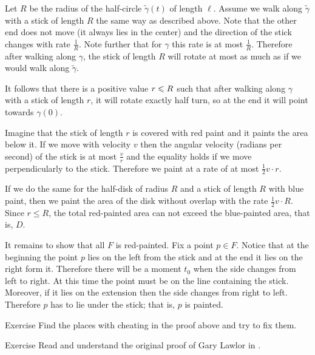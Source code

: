 Let $R$ be the radius of the half-circle $\tilde\gamma(t)$ of length $\ell$.
Assume we walk along $\tilde\gamma$  with a stick of length $R$ the same way as described above.
Note that the other end does not move (it always lies in the center) and the direction of the stick changes with rate $\tfrac1R$.
Note further that for $\gamma$ this rate is at most $\tfrac1R$.
Therefore after walking along $\gamma$,
the stick of length $R$ will rotate at most as much as if we would walk along $\tilde\gamma$.



It follows that there is a positive value $r\z\le R$ such that after walking along $\gamma$ with a stick of length $r$, it will rotate exactly half turn, so at the end it will point towards $\gamma(0)$.



Imagine that the stick of length $r$ is covered with red paint and it paints the area below it.
If we move with velocity $v$ then the angular velocity (radians per second) of the stick is at most $\tfrac vr$ and the equality holds if we move perpendicularly to the stick.
Therefore we paint at a rate of at most $\tfrac12 v\cdot r$.



If we do the same for the half-disk of radius $R$ and a stick of length $R$ with blue paint,
then we paint the area of the disk without overlap with the rate $\tfrac12 v\cdot R$.
Since $r\le R$, the total red-painted area can not exceed the blue-painted area, that is, $D$. 



It remains to show that all $F$ is red-painted.
Fix a point $p\in F$.
Notice that at the beginning the point $p$ lies on the left from the stick and at the end it lies on the right form it.
Therefore there will be a moment $t_0$ when the side changes from left to right.
At this time the point must be on the line containing the stick. 
Moreover, if it lies on the extension then the side changes from right to left. Therefore $p$ has to lie under the stick; that is, $p$ is painted.

\qeds



\begin{thm}{Exercise}
Find the places with cheating in the proof above and try to fix them.
\end{thm}



\begin{thm}{Exercise} Read and understand the original proof of Gary Lawlor in \cite{lawlor}.
\end{thm}










